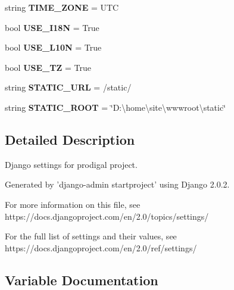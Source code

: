 \begin{DoxyCompactItemize}
\mbox{\label{namespaceprodigal_1_1settings_a5ae9e7d928d39621c5486efdd0c6bf6b}} 
string {\bfseries T\+I\+M\+E\+\_\+\+Z\+O\+NE} = \textquotesingle{}U\+TC\textquotesingle{}
\item 
\mbox{\label{namespaceprodigal_1_1settings_aba95feb5245d9abc9dd0e4434f977f17}} 
bool {\bfseries U\+S\+E\+\_\+\+I18N} = True
\item 
\mbox{\label{namespaceprodigal_1_1settings_acb0d50c61783e7a3aa1812d1eca69a71}} 
bool {\bfseries U\+S\+E\+\_\+\+L10N} = True
\item 
\mbox{\label{namespaceprodigal_1_1settings_a6ee4ceab6017ab4e7f7e4e2f05d4a346}} 
bool {\bfseries U\+S\+E\+\_\+\+TZ} = True
\item 
\mbox{\label{namespaceprodigal_1_1settings_a38f00217ee04a7ba16280b56a87da296}} 
string {\bfseries S\+T\+A\+T\+I\+C\+\_\+\+U\+RL} = \textquotesingle{}/static/\textquotesingle{}
\item 
\mbox{\label{namespaceprodigal_1_1settings_abfb4c60d3a0b3433e170f595bff4dc0d}} 
string {\bfseries S\+T\+A\+T\+I\+C\+\_\+\+R\+O\+OT} = \char`\"{}D\+:\textbackslash{}home\textbackslash{}site\textbackslash{}wwwroot\textbackslash{}static\char`\"{}
\end{DoxyCompactItemize}


\subsection{Detailed Description}
\begin{DoxyVerb}Django settings for prodigal project.

Generated by 'django-admin startproject' using Django 2.0.2.

For more information on this file, see
https://docs.djangoproject.com/en/2.0/topics/settings/

For the full list of settings and their values, see
https://docs.djangoproject.com/en/2.0/ref/settings/
\end{DoxyVerb}
 

\subsection{Variable Documentation}
\mbox{\label{namespaceprodigal_1_1settings_a6c0a4802fa46b245f018846d5f23b2d4}} 

